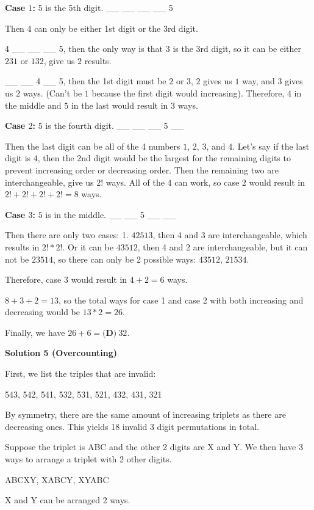 \begin{enumerate}
 \textbf{Case $1$:} 5 is the 5th digit. \_\_ \_\_ \_\_ \_\_ 5

 Then $4$ can only be either 1st digit or the 3rd digit. 

 4 \_\_ \_\_ \_\_ 5, then the only way is that $3$ is the 3rd digit, so it can be either $231$ or $132$, give us $2$ results. 

 \_\_ \_\_ 4 \_\_ 5, then the 1st digit must be $2$ or $3$, $2$ gives us $1$ way, and $3$ gives us $2$ ways. (Can't be $1$ because the first digit would increasing). Therefore, $4$ in the middle and $5$ in the last would result in $3$ ways. 

 \textbf{Case $2$:} $5$ is the fourth digit. \_\_ \_\_ \_\_ 5 \_\_

 Then the last digit can be all of the 4 numbers $1$, $2$, $3$, and $4$. Let's say if the last digit is $4$, then the 2nd digit would be the largest for the remaining digits to prevent increasing order or decreasing order. Then the remaining two are interchangeable, give us $2!$ ways. All of the $4$ can work, so case $2$ would result in $2!+2!+2!+2!=8$ ways. 

 \textbf{Case $3$:} $5$ is in the middle. \_\_ \_\_ 5 \_\_ \_\_

 Then there are only two cases: 1. $42513$, then 4 and 3 are interchangeable, which results in $2!*2!$. Or it can be $43512$, then 4 and 2 are interchangeable, but it can not be $23514$, so there can only be 2 possible ways: $43512$, $21534$. 

 Therefore, case 3 would result in $4+2=6$ ways. 

 $8+3+2=13$, so the total ways for case 1 and case 2 with both increasing and decreasing would be $13*2=26.$

 Finally, we have $26+6=\boxed{\textbf{(D)} ~32}.$




\textbf{Solution 5 (Overcounting)}

First, we list the triples that are invalid:

 543, 542, 541, 532, 531, 521, 432, 431, 321

 By symmetry, there are the same amount of increasing triplets as there are decreasing ones. This yields 18 invalid 3 digit permutations in total.

 Suppose the triplet is ABC and the other 2 digits are X and Y. We then have 3 ways to arrange a triplet with 2 other digits.

 ABCXY, XABCY, XYABC

 X and Y can be arranged 2 ways.


\end{enumerate}
